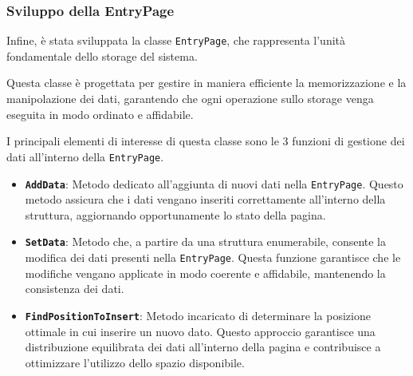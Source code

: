 \documentclass[12pt,a4paper,openright,twoside]{book}
\begin{document}
                

                

                \clearpage

            \subsubsection{Sviluppo della EntryPage}

                Infine, è stata sviluppata la classe \texttt{EntryPage}, che rappresenta l'unità fondamentale dello storage del sistema.

                Questa classe è progettata per gestire in maniera efficiente la memorizzazione e la manipolazione dei dati, garantendo che ogni operazione sullo storage venga eseguita in modo ordinato e affidabile.

                I principali elementi di interesse di questa classe sono le 3 funzioni di gestione dei dati all'interno della \texttt{EntryPage}.

                \begin{itemize}
                    \item \textbf{\texttt{AddData}}: Metodo dedicato all'aggiunta di nuovi dati nella \texttt{EntryPage}.
                    Questo metodo assicura che i dati vengano inseriti correttamente all'interno della struttura, aggiornando opportunamente lo stato della pagina.
                    \item \textbf{\texttt{SetData}}: Metodo che, a partire da una struttura enumerabile, consente la modifica dei dati presenti nella \texttt{EntryPage}.
                    Questa funzione garantisce che le modifiche vengano applicate in modo coerente e affidabile, mantenendo la consistenza dei dati.
                    \item \textbf{\texttt{FindPositionToInsert}}: Metodo incaricato di determinare la posizione ottimale in cui inserire un nuovo dato. Questo approccio garantisce una distribuzione equilibrata dei dati all'interno della pagina e contribuisce a ottimizzare l'utilizzo dello spazio disponibile.
                \end{itemize}

                
\end{document}
